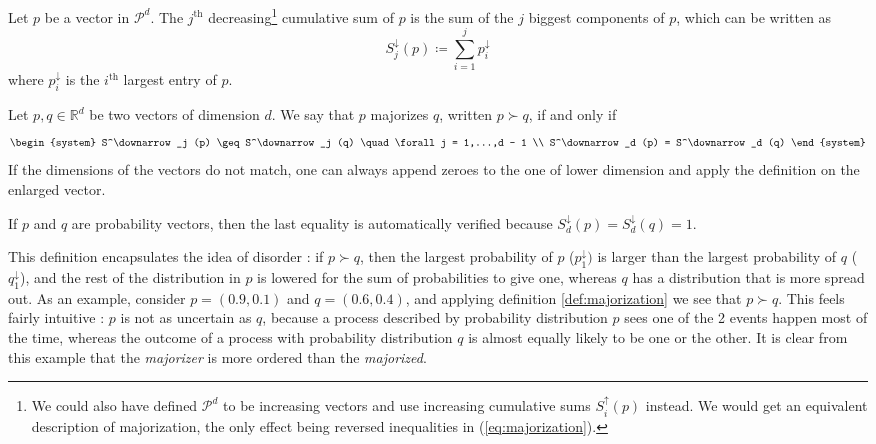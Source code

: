 \begin{definition}[Cumulative sum] %
    Let $p$ be a vector in $\mathcal{P}^d$. The $j^{\text{th}}$ decreasing\footnote{We could also have defined $\mathcal{P}^d$ to be increasing vectors and use increasing cumulative sums $S^\uparrow_i (p)$ instead. We would get an equivalent description of majorization, the only effect being reversed inequalities in (\ref{eq:majorization}).} cumulative sum of $p$ is the sum of the $j$ biggest components of $p$, which can be written as
    \begin{equation}
        S^\downarrow_j (p) \coloneqq \sum_{i = 1}^{j} p^\downarrow_i
    \end{equation}
    where $p^\downarrow_i$ is the $i^{\text{th}}$ largest entry of $p$. 

\end{definition}
\begin{definition} \label{def:majorization}
    Let $p, q \in \mathbb{R}^d$ be two vectors of dimension $d$. We say that $p$ majorizes $q$, written $p \succ q$, if and only if
    \begin{equation} \label{eq:majorization}
        \begin{system}
            S^\downarrow_j (p) \geq S^\downarrow_j (q) \quad \forall j = 1,...,d - 1 \\
            S^\downarrow_d (p) = S^\downarrow_d (q)
        \end{system}
    \end{equation}
If the dimensions of the vectors do not match, one can always append zeroes to the one of lower dimension and apply the definition on the enlarged vector.
\end{definition}

\begin{remark}
    If $p$ and $q$ are probability vectors, then the last equality is automatically verified because $S^\downarrow_d (p) = S^\downarrow_d (q) = 1$.
\end{remark}

This definition encapsulates the idea of disorder : if $p \succ q$, then the largest probability of $p$ ($p_1^\downarrow)$ is larger than the largest probability of $q$ ($q_1^\downarrow$), and the rest of the distribution in $p$ is lowered for the sum of probabilities to give one, whereas $q$ has a distribution that is more spread out. As an example, consider $p = (0.9, 0.1)$ and $q = (0.6, 0.4)$, and applying definition \ref{def:majorization} we see that $p \succ q$. This feels fairly intuitive : $p$ is not as uncertain as $q$, because a process described by probability distribution $p$ sees one of the 2 events happen most of the time, whereas the outcome of a process with probability distribution $q$ is almost equally likely to be one or the other. It is clear from this example that the \textit{majorizer} is more ordered than the \textit{majorized}.

